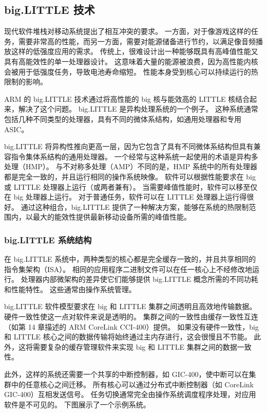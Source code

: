 \subsection{big.LITTLE 技术}\label{sec:big-little-tec}

现代软件堆栈对移动系统提出了相互冲突的要求。
一方面，对于像游戏这样的任务，需要非常高的性能，而另一方面，需要对能源储备进行节约，以满足像音频播放这样的低强度应用的需求。
传统上，很难设计出一种能够既具有高峰值性能又具有高能效性的单一处理器设计。
这意味着大量的能源被浪费，因为高性能内核会被用于低强度任务，导致电池寿命缩短。
性能本身受到核心可以持续运行的热限制的影响。

ARM 的 big.LITTLE 技术通过将高性能的 big 核与能效高的 LITTLE 核结合起来，解决了这个问题。
big.LITTLE 是异构处理系统的一个例子。
这种系统通常包括几种不同类型的处理器，具有不同的微体系结构，如通用处理器和专用 ASIC。

big.LITTLE 将异构性推向更高一层，因为它包含了具有不同微体系结构但具有兼容指令集体系结构的通用处理器。
一个经常与这种系统一起使用的术语是异构多处理（HMP）。
与不对称多处理（AMP）不同的是，HMP 系统中的所有处理器都是完全一致的，并且运行相同的操作系统映像。
软件可以根据性能要求在 big 或 LITTLE 处理器上运行（或两者兼有）。
当需要峰值性能时，软件可以移至仅在 big 处理器上运行。
对于普通任务，软件可以在 LITTLE 处理器上运行得很好。
通过这种组合，big.LITTLE 提供了一种解决方案，能够在系统的热限制范围内，以最大的能效性提供最新移动设备所需的峰值性能。

\subsubsection{big.LITTLE 系统结构}

在 big.LITTLE 系统中，两种类型的核心都是完全缓存一致的，并且共享相同的指令集架构（ISA）。
相同的应用程序二进制文件可以在任一核心上不经修改地运行。
处理器内部微架构的差异使它们能够提供 big.LITTLE 概念所需的不同功耗和性能特性。
这些通常由操作系统管理。

big.LITTLE 软件模型要求在 big 和 LITTLE 集群之间透明且高效地传输数据。
硬件一致性使这一点对软件来说是透明的。
集群之间的一致性由缓存一致性互连（如第 14 章描述的 ARM CoreLink CCI-400）提供。
如果没有硬件一致性，big 和 LITTLE 核心之间的数据传输将始终通过主内存进行，这会很慢且不节能。
此外，这将需要复杂的缓存管理软件来实现 big 和 LITTLE 集群之间的数据一致性。

此外，这样的系统还需要一个共享的中断控制器，如 GIC-400，使中断可以在集群中的任意核心之间迁移。
所有核心可以通过分布式中断控制器（如 CoreLink GIC-400）互相发送信号。
任务切换通常完全由操作系统调度程序处理，对应用软件是不可见的。
下图展示了一个示例系统。

